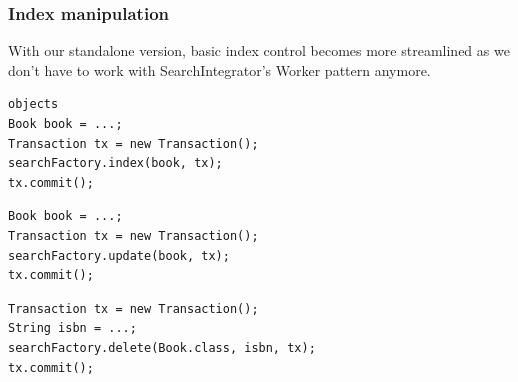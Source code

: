 \pagebreak

\subsubsection{Index manipulation}

With our standalone version, basic index control becomes more streamlined as we don't have to work with  SearchIntegrator's Worker pattern anymore.
\\
\lstset{language=java}
\begin{lstlisting}[frame=htrbl, caption={Indexing an object with the standalone version}, label={lst:indexing_object_native.java}]objects
Book book = ...;
Transaction tx = new Transaction();
searchFactory.index(book, tx);
tx.commit();
\end{lstlisting}

\lstset{language=java}
\begin{lstlisting}[frame=htrbl, caption={Updating an object with the standalone version}, label={lst:updating_object_native.java}]
Book book = ...;
Transaction tx = new Transaction();
searchFactory.update(book, tx);
tx.commit();
\end{lstlisting}

\lstset{language=java}
\begin{lstlisting}[frame=htrbl, caption={Deleting an object by id with the standalone version}, label={lst:deleting_object_native.java}]
Transaction tx = new Transaction();
String isbn = ...;
searchFactory.delete(Book.class, isbn, tx);
tx.commit();
\end{lstlisting}

\pagebreak

